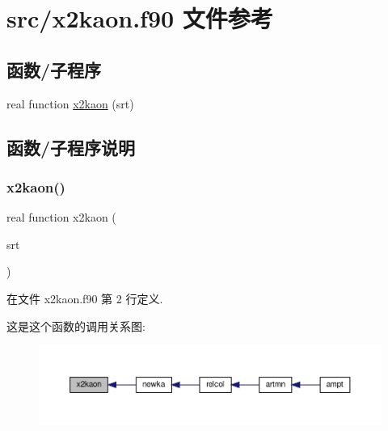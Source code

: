 \hypertarget{x2kaon_8f90}{}\section{src/x2kaon.f90 文件参考}
\label{x2kaon_8f90}
\subsection*{函数/子程序}
\begin{DoxyCompactItemize}
\item 
real function \mbox{\hyperlink{x2kaon_8f90_a9790cae30f7df26c088543c85f4fb4c8}{x2kaon}} (srt)
\end{DoxyCompactItemize}


\subsection{函数/子程序说明}
\mbox{\label{x2kaon_8f90_a9790cae30f7df26c088543c85f4fb4c8}} 
\subsubsection{\texorpdfstring{x2kaon()}{x2kaon()}}
{\footnotesize\ttfamily real function x2kaon (\begin{DoxyParamCaption}\item[{}]{srt }\end{DoxyParamCaption})}



在文件 x2kaon.\+f90 第 2 行定义.

这是这个函数的调用关系图\+:
\nopagebreak
\begin{figure}[H]
\begin{center}
\leavevmode
\includegraphics[width=350pt]{x2kaon_8f90_a9790cae30f7df26c088543c85f4fb4c8_icgraph}
\end{center}
\end{figure}
